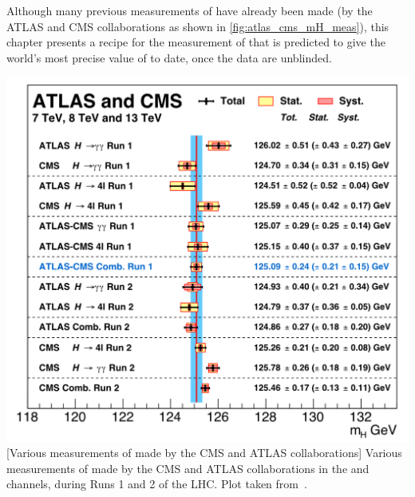 Although many previous measurements of \mH have already been made (\eg by the ATLAS and CMS collaborations as shown in \cref{fig:atlas_cms_mH_meas}), this chapter presents a recipe for the measurement of \mH that is predicted to give the world's most precise value of \mH to date, once the data are unblinded.
\begin{multiFigure}
    \centering
        \includegraphics[width=\textwidth,keepaspectratio]{figures/higgsmassmeas/all_mH_measurements_atlas_cms.png}
        [Various measurements of \mH made by the CMS and ATLAS collaborations]
        {Various measurements of \mH made by the CMS and ATLAS collaborations in the \htoyy and \hzzfourl channels, during Runs 1 and 2 of the LHC.
        Plot taken from~\cite{particle_data_group_review_2020}.}
    \label{fig:atlas_cms_mH_meas}
\end{multiFigure}
